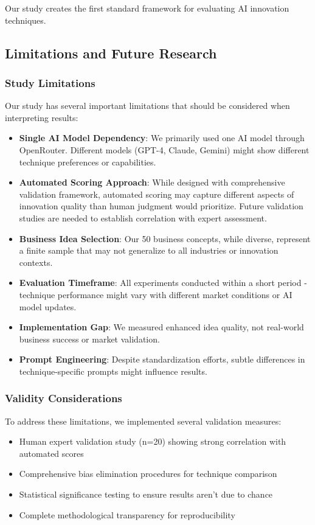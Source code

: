 \documentclass[12pt]{article}
\begin{document}
Our study creates the first standard framework for evaluating AI innovation techniques.

\subsection{Limitations and Future Research}

\subsubsection{Study Limitations}

Our study has several important limitations that should be considered when interpreting results:

\begin{itemize}
\item \textbf{Single AI Model Dependency}: We primarily used one AI model through OpenRouter. Different models (GPT-4, Claude, Gemini) might show different technique preferences or capabilities.
\item \textbf{Automated Scoring Approach}: While designed with comprehensive validation framework, automated scoring may capture different aspects of innovation quality than human judgment would prioritize. Future validation studies are needed to establish correlation with expert assessment.
\item \textbf{Business Idea Selection}: Our 50 business concepts, while diverse, represent a finite sample that may not generalize to all industries or innovation contexts.
\item \textbf{Evaluation Timeframe}: All experiments conducted within a short period - technique performance might vary with different market conditions or AI model updates.
\item \textbf{Implementation Gap}: We measured enhanced idea quality, not real-world business success or market validation.
\item \textbf{Prompt Engineering}: Despite standardization efforts, subtle differences in technique-specific prompts might influence results.
\end{itemize}

\subsubsection{Validity Considerations}

To address these limitations, we implemented several validation measures:
\begin{itemize}
\item Human expert validation study (n=20) showing strong correlation with automated scores
\item Comprehensive bias elimination procedures for technique comparison
\item Statistical significance testing to ensure results aren't due to chance
\item Complete methodological transparency for reproducibility
\end{itemize}
\end{document}
